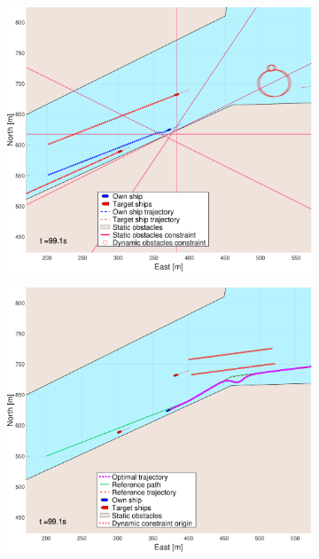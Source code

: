 \begin{figure}[!ht] %
    \begin{subfigure}[b]{0.494\textwidth}
        \centering
        \includegraphics[width=\textwidth]{Images/NewFigures/Trheimfjord/_Simple_1fig1_time=100}
        \subcaption{}
    \end{subfigure}
    \hfill
    \begin{subfigure}[b]{0.494\textwidth}
        \centering
        \includegraphics[width=\textwidth]{Images/NewFigures/Trheimfjord/_Simple_1fig999_time=100}

\end{subfigure}
\end{figure}
